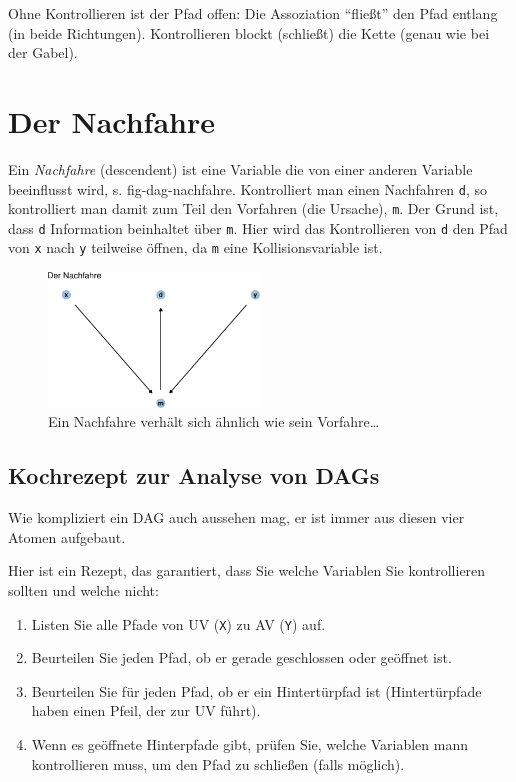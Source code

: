 \documentclass[
  a4paper,
  DIV=11]{scrreprt}
\providecommand{\tightlist}{%
  \setlength{\itemsep}{0pt}\setlength{\parskip}{0pt}}\usepackage{longtable,booktabs,array}
\theoremstyle{definition}
\theoremstyle{remark}
\begin{document}
Ohne Kontrollieren ist der Pfad offen: Die Assoziation ``fließt'' den
Pfad entlang (in beide Richtungen). Kontrollieren blockt (schließt) die
Kette (genau wie bei der Gabel).

\hypertarget{der-nachfahre}{%
\section{Der Nachfahre}\label{der-nachfahre}}

Ein \emph{Nachfahre} (descendent) ist eine Variable die von einer
anderen Variable beeinflusst wird, s. fig-dag-nachfahre. Kontrolliert
man einen Nachfahren \texttt{d}, so kontrolliert man damit zum Teil den
Vorfahren (die Ursache), \texttt{m}. Der Grund ist, dass \texttt{d}
Information beinhaltet über \texttt{m}. Hier wird das Kontrollieren von
\texttt{d} den Pfad von \texttt{x} nach \texttt{y} teilweise öffnen, da
\texttt{m} eine Kollisionsvariable ist.

\begin{figure}

{\centering \includegraphics[width=0.5\textwidth,height=\textheight]{./kausal_files/figure-pdf/fig-dag-nachfahre-1.pdf}

}

\caption{\label{fig-dag-nachfahre}Ein Nachfahre verhält sich ähnlich wie
sein Vorfahre\ldots{}}

\end{figure}

\hypertarget{kochrezept-zur-analyse-von-dags}{%
\subsection{Kochrezept zur Analyse von
DAGs}\label{kochrezept-zur-analyse-von-dags}}

Wie kompliziert ein DAG auch aussehen mag, er ist immer aus diesen vier
Atomen aufgebaut.

Hier ist ein Rezept, das garantiert, dass Sie welche Variablen Sie
kontrollieren sollten und welche nicht:

\begin{enumerate}
\def\labelenumi{\arabic{enumi}.}
\tightlist
\item
  Listen Sie alle Pfade von UV (\texttt{X}) zu AV (\texttt{Y}) auf.
\item
  Beurteilen Sie jeden Pfad, ob er gerade geschlossen oder geöffnet ist.
\item
  Beurteilen Sie für jeden Pfad, ob er ein Hintertürpfad ist
  (Hintertürpfade haben einen Pfeil, der zur UV führt).
\item
  Wenn es geöffnete Hinterpfade gibt, prüfen Sie, welche Variablen mann
  kontrollieren muss, um den Pfad zu schließen (falls möglich).
\end{enumerate}
\end{document}
